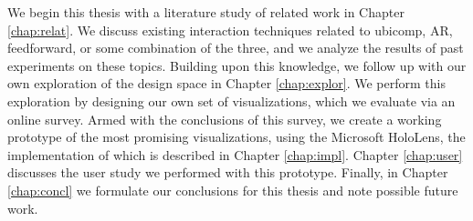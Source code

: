 We begin this thesis with a literature study of related work in Chapter \ref{chap:relat}. We discuss existing interaction techniques related to ubicomp, AR, feedforward, or some combination of the three, and we analyze the results of past experiments on these topics. Building upon this knowledge, we follow up with our own exploration of the design space in Chapter \ref{chap:explor}. We perform this exploration by designing our own set of visualizations, which we evaluate via an online survey. Armed with the conclusions of this survey, we create a working prototype of the most promising visualizations, using the Microsoft HoloLens, the implementation of which is described in Chapter \ref{chap:impl}. Chapter \ref{chap:user} discusses the user study we performed with this prototype. Finally, in Chapter \ref{chap:concl} we formulate our conclusions for this thesis and note possible future work.







